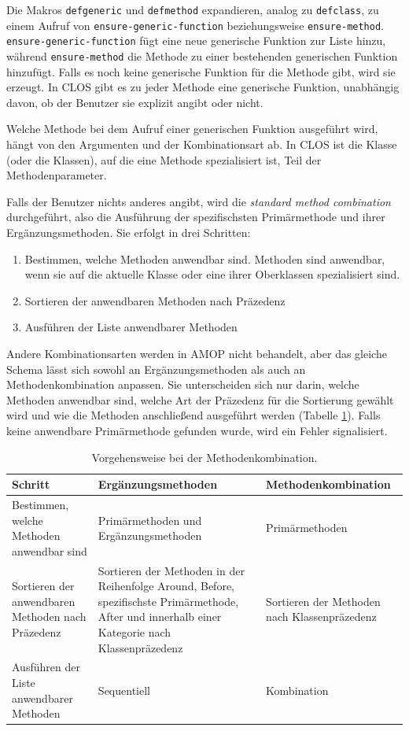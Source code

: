 Die Makros \texttt{defgeneric} und \texttt{defmethod} expandieren, analog zu \texttt{defclass}, zu einem Aufruf von \texttt{ensure-generic-function} beziehungsweise \texttt{ensure-method}. \texttt{ensure-generic-function} fügt eine neue generische Funktion zur Liste hinzu, während \texttt{ensure-method} die Methode zu einer bestehenden generischen Funktion hinzufügt. Falls es noch keine generische Funktion für die Methode gibt, wird sie erzeugt. In CLOS gibt es zu jeder Methode eine generische Funktion, unabhängig davon, ob der Benutzer sie explizit angibt oder nicht.

Welche Methode bei dem Aufruf einer generischen Funktion ausgeführt wird, hängt von den Argumenten und der Kombinationsart ab. In CLOS ist die Klasse (oder die Klassen), auf die eine Methode spezialisiert ist, Teil der Methodenparameter. 

Falls der Benutzer nichts anderes angibt, wird die \emph{standard method combination} durchgeführt, also die Ausführung der spezifischsten Primärmethode und ihrer Ergänzungsmethoden. Sie erfolgt in drei Schritten:
\begin{enumerate}
 \item Bestimmen, welche Methoden anwendbar sind. Methoden sind anwendbar, wenn sie auf die aktuelle Klasse oder eine ihrer Oberklassen spezialisiert sind.
 \item Sortieren der anwendbaren Methoden nach Präzedenz
 \item Ausführen der Liste anwendbarer Methoden
\end{enumerate}

Andere Kombinationsarten werden in AMOP nicht behandelt, aber das gleiche Schema lässt sich sowohl an Ergänzungsmethoden als auch an Methodenkombination anpassen. Sie unterscheiden sich nur darin, welche Methoden anwendbar sind, welche Art der Präzedenz für die Sortierung gewählt wird und wie die Methoden anschließend ausgeführt werden (Tabelle \ref{combination}). Falls keine anwendbare Primärmethode gefunden wurde, wird ein Fehler signalisiert.

\begin{table}[h]
\begin{tabular}{|p{4.7cm}|p{4.5cm}|p{4.5cm}|}
 \hline
 \textbf{Schritt} & \textbf{Ergänzungsmethoden} & \textbf{Methodenkombination}\\\hline
 Bestimmen, welche Methoden anwendbar sind & Primärmethoden und Ergänzungsmethoden & Primärmethoden \\\hline
 Sortieren der anwendbaren Methoden nach Präzedenz & Sortieren der Methoden in der Reihenfolge Around, Before, spezifischste Primärmethode, After und innerhalb einer Kategorie nach Klassenpräzedenz & Sortieren der Methoden nach Klassenpräzedenz\\\hline
 Ausführen der Liste anwendbarer Methoden & Sequentiell & Kombination\\\hline
\end{tabular}
 \caption{Vorgehensweise bei der Methodenkombination.}
 \label{combination}
\end{table}


